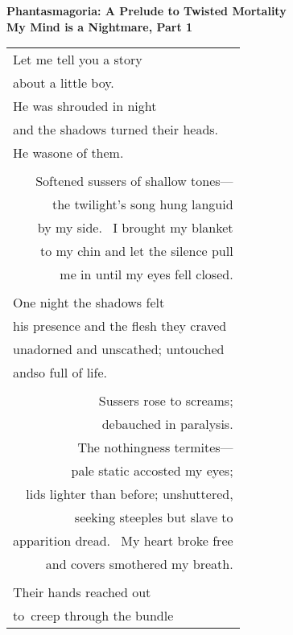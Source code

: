 \documentclass{article}
\begin{document}
\begin{center}
\textbf{Phantasmagoria: A Prelude to Twisted Mortality} \\
{\small\textbf{My Mind is a Nightmare, Part 1}} \\
\vspace*{2ex}
\begin{tabular}{l}
Let me tell you a story \\
about a little boy. \\
He was shrouded in night \\
and the shadows turned their heads. \\
He was\hspace*{4ex}one of them. \\
\\
\multicolumn{1}{r}{Softened sussers of shallow tones---} \\
\multicolumn{1}{r}{the twilight's song hung languid} \\
\multicolumn{1}{r}{by my side.  I brought my blanket} \\
\multicolumn{1}{r}{to my chin and let the silence pull} \\
\multicolumn{1}{r}{me in until my eyes fell closed.} \\
\\
One night the shadows felt \\
his presence and the flesh they craved \\
unadorned and unscathed; untouched \\
and\hspace*{4ex}so full of life. \\
\\
\multicolumn{1}{r}{Sussers rose to screams;} \\
\multicolumn{1}{r}{debauched in paralysis.} \\
\multicolumn{1}{r}{The nothingness termites---} \\
\multicolumn{1}{r}{pale static accosted my eyes;} \\
\multicolumn{1}{r}{lids lighter than before; unshuttered,} \\
\multicolumn{1}{r}{seeking steeples but slave to} \\
\multicolumn{1}{r}{apparition dread.  My heart broke free} \\
\multicolumn{1}{r}{and covers smothered my breath.} \\
\\
Their hands reached out \\
to creep through the bundle \\

\end{tabular}
\end{center}
\end{document}
